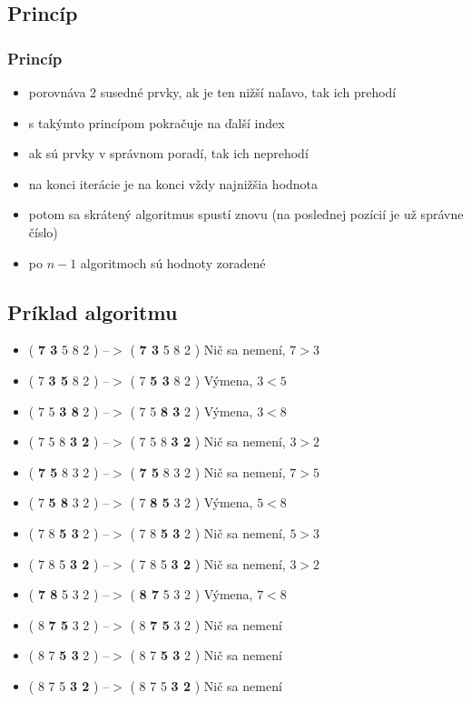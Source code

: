 \documentclass{beamer}
\begin{document}
	\subsection{Princíp}
	\begin{frame}
		\frametitle{Princíp}
		\begin{itemize}
			\item porovnáva 2 susedné prvky, ak je ten nižší naľavo, tak ich prehodí
			\item s takýmto princípom pokračuje na ďalší index
			\item ak sú prvky v správnom poradí, tak ich neprehodí
			\item na konci iterácie je na konci vždy najnižšia hodnota
			\item potom sa skrátený algoritmus spustí znovu (na poslednej pozícií je už správne číslo)
			\item po $n - 1$ algoritmoch sú hodnoty zoradené
		\end{itemize}
	\end{frame}
	
	\subsection{Príklad algoritmu}
	\begin{frame}
		\begin{example}
			\begin{itemize}
				\item <1-> ( \textbf{7 3} 5 8 2 ) $–>$ ( \textbf{7 3} 5 8 2 ) Nič sa nemení, $7 > 3$ 
				\item <2-> ( 7 \textbf{3 5} 8 2 ) $–>$ ( 7 \textbf{5 3} 8 2 ) Výmena, $3 < 5$
				\item <3-> ( 7 5 \textbf{3 8} 2 ) $–>$ ( 7 5 \textbf{8 3} 2 ) Výmena, $3 < 8$
				\item <4-> ( 7 5 8 \textbf{3 2} ) $–>$ ( 7 5 8 \textbf{3 2} ) Nič sa nemení, $3 > 2$

				\item <5-> ( \textbf{7 5} 8 3 2 ) $–>$ ( \textbf{7 5} 8 3 2 ) Nič sa nemení, $7 > 5$
				\item <6-> ( 7 \textbf{5 8} 3 2 ) $–>$ ( 7 \textbf{8 5} 3 2 ) Výmena, $5 < 8$
				\item <7-> ( 7 8 \textbf{5 3} 2 ) $–>$ ( 7 8 \textbf{5 3} 2 ) Nič sa nemení, $5 > 3$
				\item <8-> ( 7 8 5 \textbf{3 2} ) $–>$ ( 7 8 5 \textbf{3 2} ) Nič sa nemení, $3 > 2$

				\item <9-> ( \textbf{7 8} 5 3 2 ) $–>$ ( \textbf{8 7} 5 3 2 ) Výmena, $7 < 8$
				\item <10-> ( 8 \textbf{7 5} 3 2 ) $–>$ ( 8 \textbf{7 5} 3 2 ) Nič sa nemení
				\item <10-> ( 8 7 \textbf{5 3} 2 ) $–>$ ( 8 7 \textbf{5 3} 2 ) Nič sa nemení
				\item <10-> ( 8 7 5 \textbf{3 2} ) $–>$ ( 8 7 5 \textbf{3 2} ) Nič sa nemení
			\end{itemize}
		\end{example}
	\end{frame}
\end{document}
